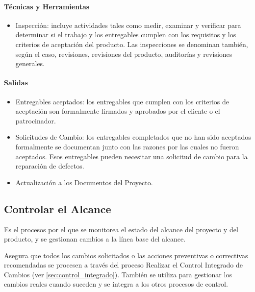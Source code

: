 \documentclass[a4paper,twosides]{article}
\newlength{\wideitemsep}
\let\olditem\item
\renewcommand{\item}{\setlength{\itemsep}{\wideitemsep}\olditem}
\begin{document}
\paragraph{Técnicas y Herramientas}
\begin{itemize}
\item Inspección: incluye actividades tales como medir, examinar y verificar para determinar si el trabajo y los entregables cumplen con los requisitos y los criterios de aceptación del producto. Las inspecciones se denominan también, según el caso, revisiones, revisiones del producto, auditorías y revisiones generales.
\end{itemize}
\paragraph{Salidas}
\begin{itemize}
\item Entregables aceptados: los entregables que cumplen con los criterios de aceptación son formalmente firmados y aprobados por el cliente o el patrocinador.
\item Solicitudes de Cambio: los entregables completados que no han sido aceptados formalmente se documentan junto con las razones por las cuales no fueron aceptados. Esos entregables pueden necesitar una solicitud de cambio para la reparación de defectos.
\item Actualización a los Documentos del Proyecto.
\end{itemize}
\subsection{Controlar el Alcance} \label{sec:controlar_alcance}
\par Es el procesos por el que se monitorea el estado del alcance del proyecto y del producto, y se gestionan cambios a la línea base del alcance.
\par Asegura que todos los cambios solicitados o las acciones preventivas o correctivas recomendadas se procesen a través del proceso Realizar el Control Integrado de Cambios (ver \ref{sec:control_integrado}). También se utiliza para gestionar los cambios reales cuando suceden y se integra a los otros procesos de control.
\end{document}

